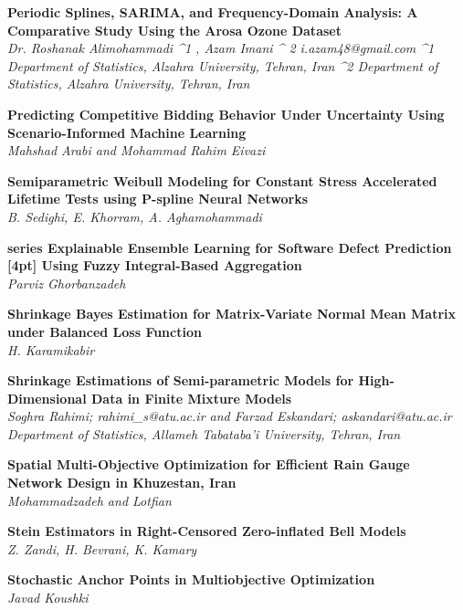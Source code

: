 \noindent
{\bf
Periodic Splines, SARIMA, and Frequency-Domain Analysis: A Comparative Study Using the Arosa Ozone Dataset
}\dotfill \pageref{p.1211}\\
{\small \it
Dr. Roshanak Alimohammadi ^1 , Azam Imani ^ 2 i.azam48@gmail.com ^1 Department of Statistics, Alzahra University, Tehran, Iran ^2 Department of Statistics, Alzahra University, Tehran, Iran
}


\noindent
{\bf
Predicting Competitive Bidding Behavior Under Uncertainty Using Scenario-Informed Machine Learning
}\dotfill \pageref{p.1255}\\
{\small \it
Mahshad Arabi and Mohammad Rahim Eivazi
}


\noindent
{\bf
Semiparametric Weibull Modeling for Constant Stress Accelerated Lifetime Tests using P-spline Neural Networks
}\dotfill \pageref{p.1195}\\
{\small \it
B. Sedighi, E. Khorram, A. Aghamohammadi
}


\noindent
{\bf
series Explainable Ensemble Learning for Software Defect Prediction [4pt] Using Fuzzy Integral-Based Aggregation
}\dotfill \pageref{p.1083}\\
{\small \it
Parviz Ghorbanzadeh
}


\noindent
{\bf
Shrinkage Bayes Estimation for Matrix-Variate Normal Mean Matrix under Balanced Loss Function
}\dotfill \pageref{p.1085}\\
{\small \it
H. Karamikabir
}


\noindent
{\bf
Shrinkage Estimations of Semi-parametric Models for High-Dimensional Data in Finite Mixture Models
}\dotfill \pageref{p.1350}\\
{\small \it
Soghra Rahimi; rahimi_s@atu.ac.ir and Farzad Eskandari; askandari@atu.ac.ir Department of Statistics, Allameh Tabataba'i University, Tehran, Iran
}


\noindent
{\bf
Spatial Multi-Objective Optimization for Efficient Rain Gauge Network Design in Khuzestan, Iran
}\dotfill \pageref{p.1038}\\
{\small \it
Mohammadzadeh and Lotfian
}


\noindent
{\bf
Stein Estimators in Right-Censored Zero-inflated Bell Models
}\dotfill \pageref{p.1005}\\
{\small \it
Z. Zandi, H. Bevrani, K. Kamary
}


\noindent
{\bf
Stochastic Anchor Points in Multiobjective Optimization
}\dotfill \pageref{p.1299}\\
{\small \it
Javad Koushki
}


